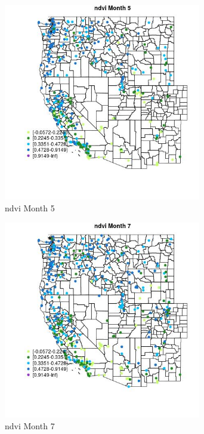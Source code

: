 \begin{figure} 
\centering  
\includegraphics[width=0.77\textwidth]{Code_Outputs/Report_ML_input_PM25_Step4_part_e_de_duplicated_aves_compiled_2019-05-18wNAs_MapObsMo5ndvi.jpg} 
\caption{\label{fig:Report_ML_input_PM25_Step4_part_e_de_duplicated_aves_compiled_2019-05-18wNAsMapObsMo5ndvi}ndvi Month 5} 
\end{figure} 
 

\begin{figure} 
\centering  
\includegraphics[width=0.77\textwidth]{Code_Outputs/Report_ML_input_PM25_Step4_part_e_de_duplicated_aves_compiled_2019-05-18wNAs_MapObsMo7ndvi.jpg} 
\caption{\label{fig:Report_ML_input_PM25_Step4_part_e_de_duplicated_aves_compiled_2019-05-18wNAsMapObsMo7ndvi}ndvi Month 7} 
\end{figure} 
 

